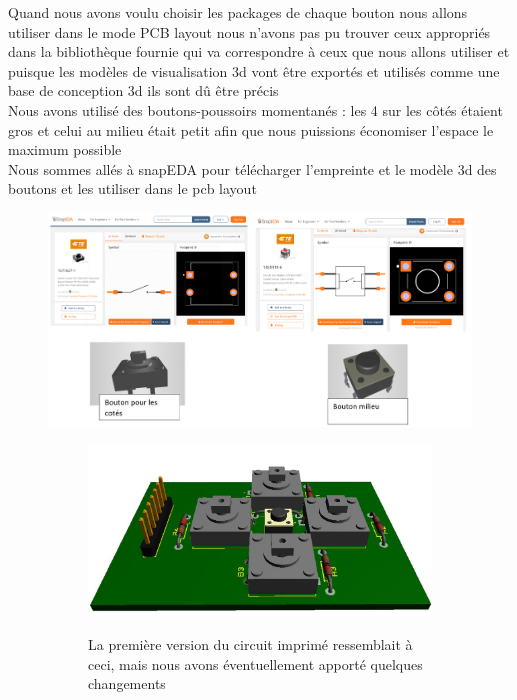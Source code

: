 \begin{figure}[!htbp]
\begin{subfigure}[t]{.45\linewidth}
    \end{subfigure}
\end{figure}

\FloatBarrier

Quand nous avons voulu choisir les packages de chaque bouton nous allons utiliser dans le mode PCB layout nous n’avons pas pu trouver ceux appropriés dans la bibliothèque fournie qui va correspondre à ceux que nous allons utiliser et puisque les modèles de visualisation 3d vont être exportés et utilisés comme une base de conception 3d ils sont dû être précis \\
Nous avons utilisé des boutons-poussoirs momentanés : les 4 sur les côtés étaient gros et celui au milieu était petit afin que nous puissions économiser l’espace  le maximum possible  \\
Nous sommes allés à snapEDA pour télécharger l’empreinte et le modèle 3d des boutons et les utiliser dans le pcb layout


\begin{figure}[!htbp]
    \centering
    \includegraphics[width=\textwidth]{assets/conception1/4.png}
\end{figure}

\FloatBarrier

\begin{figure}[!htbp]
    \centering
    \begin{subfigure}[m]{.55\linewidth}
        \centering
        \includegraphics[width=\textwidth]{assets/conception1/img80.jpg}
    \end{subfigure}
    \hfill
    \begin{subfigure}[m]{.4\linewidth}
       La première version du circuit imprimé ressemblait à ceci, mais nous avons éventuellement apporté quelques changements
    \end{subfigure}
\end{figure}

